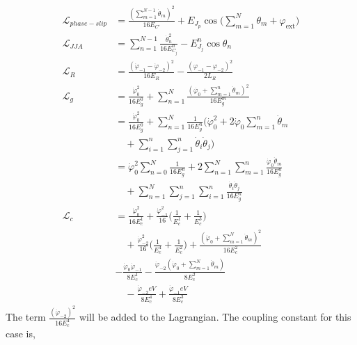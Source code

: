 \documentclass[%
reprint,
superscriptaddress,
 amsmath,amssymb,
 aps,
 prx,
longbibliography,
floatfix,
]{revtex4-2}
\begin{document}
  \begin{align}
    \mathcal{L}_{phase-slip}&=\frac{(\sum_{m=1}^{N-1}\dot\theta_m)^2}{16E_{C'}}+E_{J_p}\cos\big(\sum_{m=1}^N\theta_m+\varphi_\mathrm{ext}\big)\\
    \mathcal{L}_{JJA}&=\sum_{n=1}^{N-1}\frac{\dot{\theta}_n^2}{16E^{n}_{C_j}}-E^{n}_{J_j}\cos{\theta_n}\\
    \mathcal{L}_{R}&=\frac{(\dot{\varphi}_{-1}-\dot{\varphi}_{-2})^2}{16E_{{R}}}-\frac{(\varphi_{-1}-\varphi_{-2})^2}{2L_{R}}\\
    \mathcal{L}_{g}&=\frac{\dot{\varphi}_0^2}{16E^0_{g}}+\sum_{n=1}^N \frac{(\dot{\varphi_0}+\sum_{m=1}^n\dot{\theta}_m)^2}{16E^m_{g}}\\
    &=\frac{\dot{\varphi}_0^2}{16E^0_{g}}+\sum_{n=1}^N \frac{1}{16E^n_{g}}(\dot{\varphi}_0^2+2\dot{\varphi}_0\sum_{m=1}^n\dot{\theta}_m\nonumber\\&\quad+\sum_{i=1}^n\sum_{j=1}^{n}\dot{\theta}_i\dot{\theta}_j)\\
    &=\dot{\varphi}_0^2\sum_{n=0}^N\frac{1}{16E^n_g}+2\sum_{n=1}^N\sum_{m=1}^n\frac{\dot{\varphi}_0\dot{\theta}_m}{16E^n_{g}}\nonumber\\&\quad+\sum_{n=1}^N\sum_{j=1}^n\sum_{i=1}^{n}\frac{\dot{\theta}_i\dot{\theta}_j}{16E^n_{g}}\\
    \mathcal{L}_{c}&=\frac{\dot{\varphi}^2_0}{16E^1_c}+\frac{\dot{\varphi}^2_{-1}}{16}\Big(\frac{1}{E^1_c}+\frac{1}{E^3_c}\Big)\nonumber\\
    &\quad+\frac{\dot{\varphi}^2_{-2}}{16}\Big(\frac{1}{E^4_c}+\frac{1}{E^2_c}\Big)+\frac{(\dot{\varphi}_0+\sum_{m=1}^N\dot{\theta}_m)^2}{16E^2_c}\nonumber\\
  &-\frac{\dot{\varphi}_0\dot{\varphi}_{-1}}{8E^1_c}-\frac{\dot{\varphi}_{-2}(\dot{\varphi}_{0}+\sum_{m=1}^N\dot{\theta}_m)}{8E^2_c}\nonumber\\
    &\quad-\frac{\dot{\varphi}_{-2}eV}{8E^4_c}+\frac{\dot{\varphi}_{-1}eV}{8E^3_c}
\end{align}
The term $\frac{(\dot{\varphi}_{-2})^2}{16E^4_{c}}$ will be added to the Lagrangian. The coupling constant for this case is,
\end{document}

